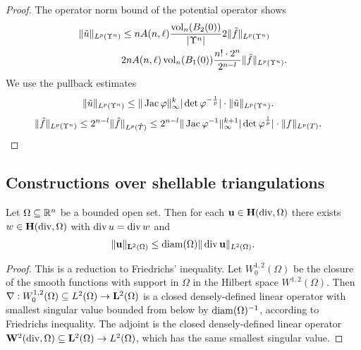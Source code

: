 \documentclass[12pt,a4paper]{article}
\begin{document}
\begin{proof}
    The operator norm bound of the potential operator shows 
    \begin{align*}
        \| \tilde u \|_{L^{p}(\Upsilon^{n})} 
        &\leq 
        n A(n,\ell) \frac{ \operatorname{vol}_{n}(B_2(0)) }{|\Upsilon^{n}|} 2 
        \| \tilde f \|_{L^{p}(\Upsilon^{n})}
        \\&
        2 n A(n,\ell) \operatorname{vol}_{n}(B_1(0)) \frac{ n! \cdot 2^{n} }{2^{n-l}} 
        \| \tilde f \|_{L^{p}(\Upsilon^{n})}
        .
    \end{align*}
    We use the pullback estimates 
    \begin{align*}
        \| \tilde u \|_{L^{p}(\Upsilon^{n})} 
        &\leq 
        \| \operatorname{{\rm Jac}}\varphi \|_{\infty}^{k}
        |\det\varphi^{-\frac{1}{p}}|
        \cdot 
        \| \tilde u \|_{L^{p}(\Upsilon^{n})} 
        .
    \end{align*}
    \begin{align*}
        \| \tilde f \|_{L^{p}(\Upsilon^{n})} 
        &\leq 
        2^{n-l}
        \| \hat f \|_{L^{p}(\hat T)} 
        \leq 
        2^{n-l}
        \| \operatorname{{\rm Jac}}\varphi^{-1} \|_{\infty}^{k+1}
        |\det\varphi^{\frac{1}{p}}|
        \cdot 
        \| f \|_{L^{p}(T)} 
        .
    \end{align*}
\end{proof}







\subsection{Constructions over shellable triangulations}



\begin{lemma}
    Let $\Omega \subseteq {\mathbb R}^{n}$ be a bounded open set. 
    Then for each ${\mathbf u} \in {\mathbf H}(\operatorname{div},\Omega)$ there exists $w \in {\mathbf H}(\operatorname{div},\Omega)$ with $\operatorname{div} u = \operatorname{div} w$ and 
    \begin{align*}
        \| {\mathbf u} \|_{{\mathbf L}^{2}(\Omega)} \leq {\operatorname{diam}}(\Omega) \| \operatorname{div} {\mathbf u} \|_{L^{2}(\Omega)}
        .
    \end{align*}
\end{lemma}
\begin{proof}
    This is a reduction to Friedrichs' inequality. 
    Let $W^{1,2}_{0}(\Omega)$ be the closure of the smooth functions with support in $\Omega$ in the Hilbert space $W^{1,2}(\Omega)$. 
    Then $\nabla : W^{1,2}_{0}(\Omega) \subseteq L^{2}(\Omega) \rightarrow {\mathbf L}^{2}(\Omega)$ is a closed densely-defined linear operator 
    with smallest singular value bounded from below by ${\operatorname{diam}}(\Omega)^{-1}$, according to Friedrichs inequality. 
    The adjoint is the closed densely-defined linear operator ${\mathbf W}^{2}(\operatorname{div},\Omega) \subseteq {\mathbf L}^{2}(\Omega) \rightarrow L^{2}(\Omega)$,
    which has the same smallest singular value. 
\end{proof}
\end{document}
